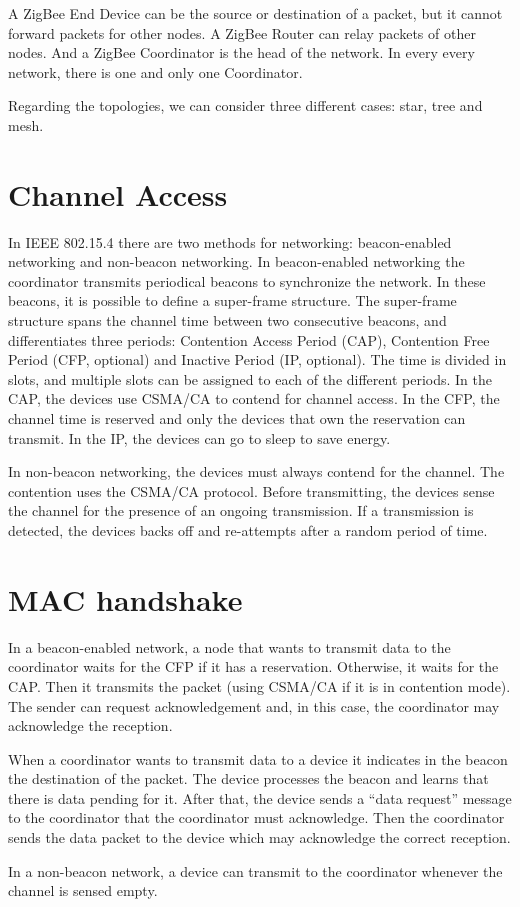 A ZigBee End Device can be the source or destination of a packet, but it cannot forward packets for other nodes.
A ZigBee Router can relay packets of other nodes.
And a ZigBee Coordinator is the head of the network.
In every every network, there is one and only one Coordinator.

Regarding the topologies, we can consider three different cases: star, tree and mesh.

\section{Channel Access}

In IEEE 802.15.4 there are two methods for networking: beacon-enabled networking and non-beacon networking.
In beacon-enabled networking the coordinator transmits periodical beacons to synchronize the network.
In these beacons, it is possible to define a super-frame structure.
The super-frame structure spans the channel time between two consecutive beacons, and differentiates three periods: Contention Access Period (CAP), Contention Free Period (CFP, optional) and Inactive Period (IP, optional).
The time is divided in slots, and multiple slots can be assigned to each of the different periods.
In the CAP, the devices use CSMA/CA to contend for channel access.
In the CFP, the channel time is reserved and only the devices that own the reservation can transmit.
In the IP, the devices can go to sleep to save energy.

In non-beacon networking, the devices must always contend for the channel.
The contention uses the CSMA/CA protocol.
Before transmitting, the devices sense the channel for the presence of an ongoing transmission.
If a transmission is detected, the devices backs off and re-attempts after a random period of time.

\section{MAC handshake}

In a beacon-enabled network, a node that wants to transmit data to the coordinator waits for the CFP if it has a reservation.
Otherwise, it waits for the CAP.
Then it transmits the packet (using CSMA/CA if it is in contention mode).
The sender can request acknowledgement and, in this case, the coordinator may acknowledge the reception.

When a coordinator wants to transmit data to a device it indicates in the beacon the destination of the packet.
The device processes the beacon and learns that there is data pending for it.
After that, the device sends a ``data request'' message to the coordinator that the coordinator must acknowledge.
Then the coordinator sends the data packet to the device which may acknowledge the correct reception.

In a non-beacon network, a device can transmit to the coordinator whenever the channel is sensed empty.
